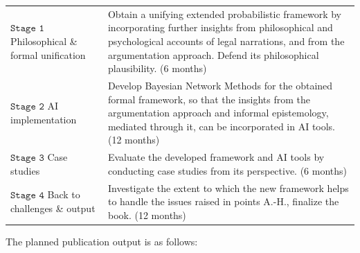 \documentclass[11pt,dvipsnames,enabledeprecatedfontcommands]{scrartcl}
\begin{document}
\vspace{1mm}
\begin{center}
\begin{tabular}{p{2.3cm}|p{12.2cm}}
\footnotesize \textbf{$\mathtt{Stage  \,\, 1}$} \newline  \tiny Philosophical \&  formal \newline  unification & 
Obtain a unifying extended  probabilistic framework by incorporating further insights  from philosophical and psychological accounts of legal narrations, and from the argumentation approach. Defend its philosophical plausibility. \scriptsize (6 months)
\\
\footnotesize \textbf{$\mathtt{Stage \,\, 2}$} \newline  \tiny AI implementation 
 & Develop Bayesian Network Methods for the obtained formal framework, so that the insights from the argumentation approach and informal epistemology, mediated through it, can be incorporated in AI tools. \scriptsize (12 months)
\\
\footnotesize \textbf{$\mathtt{Stage  \,\, 3}$} \newline  \tiny    Case studies & 
Evaluate the developed framework and AI tools  by conducting case studies from its perspective.    \scriptsize (6 months) 
\\
\footnotesize \textbf{$\mathtt{Stage  \,\, 4}$} \newline  \tiny    Back to challenges \& output & 
Investigate the extent to which the new framework helps to handle the issues raised in points A.-H., finalize the book. \scriptsize (12 months)
\end{tabular}
\end{center}

\vspace{2mm}

The planned publication output is as follows:
\end{document}
